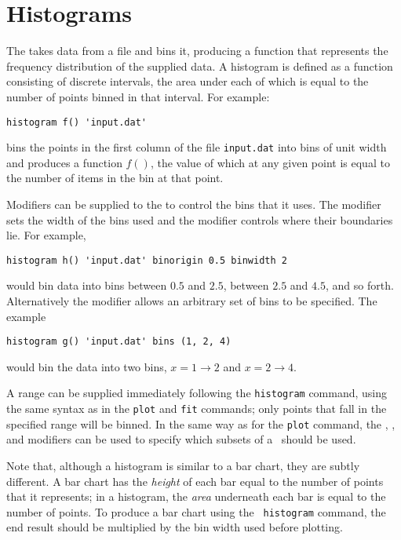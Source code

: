 \section{Histograms}
\label{sec:histogram}

The  takes data from a file and bins it, producing a
function that represents the frequency distribution of the supplied data.  A
histogram is defined as a function consisting of discrete intervals, the area
under each of which is equal to the number of points binned in that interval.
For example:

\begin{verbatim}
histogram f() 'input.dat'
\end{verbatim}

\noindent bins the points in the first column of the file {\tt input.dat}
into bins of unit width and produces a function $f()$, the value of which at any
given point is equal to the number of items in the bin at that point.

Modifiers can be supplied to the  to control the bins that
it uses.  The  modifier sets the width of the bins used and
the  modifier controls where their boundaries lie.  For
example,

\begin{verbatim}
histogram h() 'input.dat' binorigin 0.5 binwidth 2
\end{verbatim}

\noindent would bin data into bins between $0.5$ and $2.5$, between $2.5$ and
$4.5$, and so forth.  Alternatively the  modifier allows an
arbitrary set of bins to be specified. The example

\begin{verbatim}
histogram g() 'input.dat' bins (1, 2, 4)
\end{verbatim}

\noindent would bin the data into two bins, $x=1\to 2$ and $x=2\to 4$.

A range can be supplied immediately following the {\tt histogram} command,
using the same syntax as in the {\tt plot} and {\tt fit} commands; only points
that fall in the specified range will be binned.  In the same way as for the
{\tt plot} command, the , ,  and
 modifiers can be used to specify which subsets of a \datafile\
should be used.

Note that, although a histogram is similar to a bar chart, they are subtly
different.  A bar chart has the {\it height} of each bar equal to the number of
points that it represents; in a histogram, the {\it area} underneath each bar
is equal to the number of points.  To produce a bar chart using the {\tt
histogram} command, the end result should be multiplied by the bin width used
before plotting.

